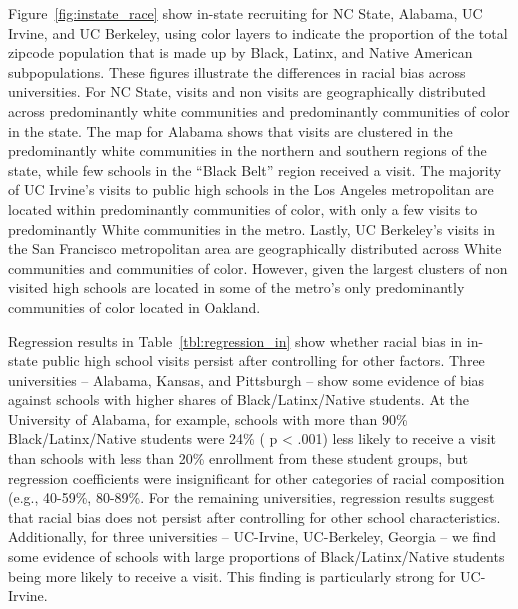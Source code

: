 \documentclass[twoside]{article}
\begin{document}
Figure~\ref{fig:instate_race} show in-state recruiting for NC State, Alabama, UC Irvine, and UC Berkeley, using color layers to indicate the proportion of the total zipcode population that is made up by Black, Latinx, and Native American subpopulations. These figures illustrate the differences in racial bias across universities. For NC State, visits and non visits are geographically distributed across predominantly white communities and predominantly communities of color in the state. The map for Alabama shows that visits are clustered in the predominantly white communities in the northern and southern regions of the state, while few schools in the ``Black Belt'' region received a visit. The majority of UC Irvine's visits to public high schools in the Los Angeles metropolitan are located within predominantly communities of color, with only a few visits to predominantly White communities in the metro. Lastly, UC Berkeley's visits in the San Francisco metropolitan area are geographically distributed across White communities and communities of color. However, given  the largest clusters of non visited high schools are located in some of the metro's only predominantly communities of color located in Oakland.

Regression results in Table~\ref{tbl:regression_in} show whether racial bias in in-state public high school visits persist after controlling for other factors. Three universities -- Alabama, Kansas, and Pittsburgh -- show some evidence of bias against schools with higher shares of Black/Latinx/Native students. At the University of Alabama, for example, schools with more than 90\% Black/Latinx/Native students were 24\% ( p < .001) less likely to receive a visit than schools with less than 20\% enrollment from these student groups, but regression coefficients were insignificant for other categories of racial composition (e.g., 40-59\%, 80-89\%. For the remaining universities, regression results suggest that racial bias does not persist after controlling for other school characteristics. Additionally, for three universities -- UC-Irvine, UC-Berkeley, Georgia -- we find some evidence of schools with large proportions of Black/Latinx/Native students being more likely to receive a visit. This finding is particularly strong for UC-Irvine.
\end{document}

